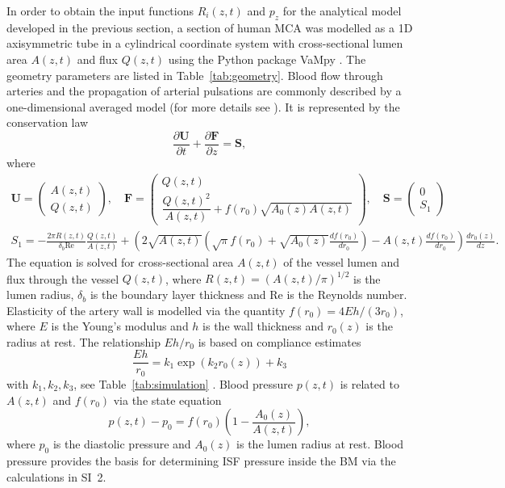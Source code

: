 \documentclass{frontiersFPHY} %
\newcommand{\dd}{\partial}
\begin{document}
In order to obtain the input functions $R_i(z,t)$ and $p_z$ for the analytical model developed in the previous section, a section of human MCA was modelled as a 1D axisymmetric tube in a cylindrical coordinate system with cross-sectional lumen area $A(z,t)$ and flux $Q(z,t)$ using the Python package VaMpy \cite{Diem2016a}. The geometry parameters are listed in Table~\ref{tab:geometry}. Blood flow through arteries and the propagation of arterial pulsations are commonly described by a one-dimensional averaged model \cite{Olufsen2000} (for more details see \cite{Diem2016}). It is represented by the conservation law
\begin{equation}
  \frac{\dd \boldsymbol{U}}{\dd t} + \frac{\dd \boldsymbol{F}}{\dd z} = \boldsymbol{S}, \label{eq:conservation}
\end{equation}
where
\begin{gather*}
  \boldsymbol{U} = \begin{pmatrix} A(z,t) \\ Q(z,t) \end{pmatrix}, \quad \boldsymbol{F} = \begin{pmatrix} Q(z,t)\\ \dfrac{Q(z,t)^2}{A(z,t)} + f(r_0) \sqrt{A_0(z) A(z,t)} \end{pmatrix}, \quad \boldsymbol{S} = \begin{pmatrix} 0\\ S_1 \end{pmatrix}\\
S_1 = - \frac{2 \pi R(z,t)}{\delta_b \mathrm{Re}} \frac{Q(z,t)}{A(z,t)} + \left( 2 \sqrt{A(z,t)} \left( \sqrt{\pi} f(r_0) + \sqrt{A_0(z)} \frac{df(r_0)}{dr_0 } \right) - A(z,t) \frac{df(r_0)}{dr_0} \right) \frac{dr_0(z)}{dz}.
\end{gather*}
The equation is solved for cross-sectional area $A(z,t)$ of the vessel lumen and flux through the vessel $Q(z,t)$, where $R(z,t) = (A(z,t)/\pi)^{1/2}$ is the lumen radius, $\delta_b$ is the boundary layer thickness and $\text{Re}$ is the Reynolds number. Elasticity of the artery wall is modelled via the quantity $f(r_0) = 4Eh/(3r_0)$, where $E$ is the Young's modulus and $h$ is the wall thickness and $r_0(z)$ is the radius at rest. The relationship $Eh/r_0$ is based on compliance estimates
\begin{equation}
  \frac{Eh}{r_0} = k_1 \exp \left( k_2 r_0(z) \right) + k_3\label{eq:ehr}
\end{equation}
with $k_1, k_2, k_3$, see Table~\ref{tab:simulation} \cite{Olufsen2000}. Blood pressure $p(z,t)$ is related to $A(z,t)$ and $f(r_0)$ via the state equation
\begin{equation}
  p(z,t) - p_0 = f(r_0) \left( 1 - \frac{A_0(z)}{A(z,t)} \right),
\end{equation}
where $p_0$ is the diastolic pressure and $A_0(z)$ is the lumen radius at rest. Blood pressure provides the basis for determining ISF pressure inside the BM via the calculations in SI~2.
\end{document}
